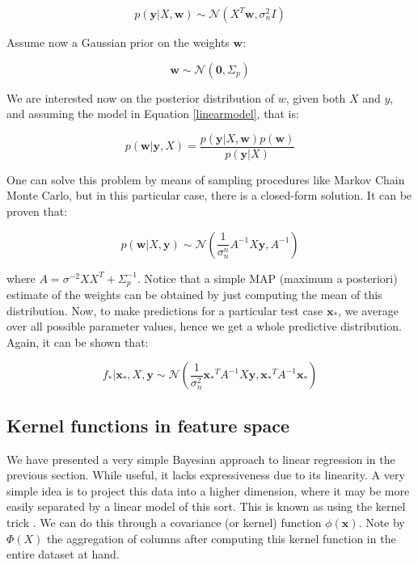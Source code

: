 \documentclass[10pt,a4paper,twoside]{book}
\begin{document}
\begin{equation}
p(\boldsymbol{y}|X, \boldsymbol{w}) \sim \mathcal{N} (X^T\boldsymbol{w}, \sigma_n^2 I)
\end{equation}

Assume now a Gaussian prior on the weights $\boldsymbol{w}$:

\begin{equation}
\label{wprior}
\boldsymbol{w} \sim \mathcal{N}(\boldsymbol{0}, \Sigma_p)
\end{equation}

We are interested now on the posterior distribution of $w$, given both $X$ and $y$, and assuming the model in Equation \ref{linearmodel}, that is:

\begin{equation}
p(\boldsymbol{w}|\boldsymbol{y}, X) = \dfrac{p(\boldsymbol{y}|X, \boldsymbol{w}) p(\boldsymbol{w})}{p(\boldsymbol{y}| X)}
\end{equation}

One can solve this problem by means of sampling procedures like Markov Chain Monte Carlo, but in this particular case, there is a closed-form solution. It can be proven that:

\begin{equation}
p(\boldsymbol{w}|X, \boldsymbol{y}) \sim \mathcal{N} \left(\dfrac{1}{\sigma_n^n}A^{-1}X\boldsymbol{y}, A^{-1}\right)
\end{equation}

where $A = \sigma^{-2}XX^T + \Sigma_p^{-1}$. Notice that a simple MAP (maximum a posteriori) estimate of the weights can be obtained by just computing the mean of this distribution. Now, to make predictions for a particular test case $\boldsymbol{x_{*}}$, we average over all possible parameter values, hence we get a whole predictive distribution. Again, it can be shown that:

\begin{equation}
f_{*}|\boldsymbol{x_{*}}, X, \boldsymbol{y} \sim \mathcal{N}\left(\dfrac{1}{\sigma_n^2}\boldsymbol{x_{*}}^T A^{-1}X\boldsymbol{y}, \boldsymbol{x_*}^T A^{-1} \boldsymbol{x}_{*}\right)
\end{equation} 

\subsection{Kernel functions in feature space}

We have presented a very simple Bayesian approach to linear regression in the previous section. While useful, it lacks expressiveness due to its linearity. A very simple idea is to project this data into a higher dimension, where it may be more easily separated by a linear model of this sort. This is known as using the kernel trick \cite{Hofmann2008}. We can do this through a covariance (or kernel) function $\phi(\boldsymbol{x})$. Note by $\Phi(X)$ the aggregation of columns after computing this kernel function in the entire dataset at hand.\\
\end{document}

